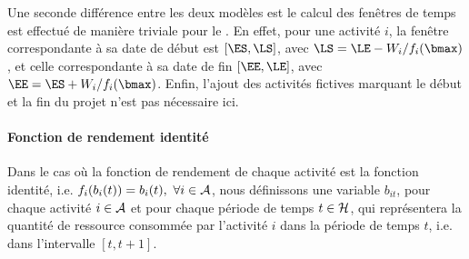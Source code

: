 Une seconde différence entre les deux modèles est le calcul des 
fenêtres de temps est effectué de manière triviale pour le \CECSP. 
En effet, pour une activité $i$,
la fenêtre correspondante à sa date de début est $[\ES,\LS]$, avec
$\LS=\LE-W_i/f_i(\bmax)$, et celle correspondante à sa date de fin
$[\EE,\LE]$, avec $\EE=\ES+W_i/f_i(\bmax)$. Enfin, l'ajout des
activités fictives marquant le début et la fin du projet n'est 
pas nécessaire ici.

\paragraph{Fonction de rendement identité}

Dans le cas où la fonction de rendement de chaque activité est la
fonction identité, i.e. $f_i(b_i(t))=b_i(t),\ \forall i \in \A$, nous
définissons une variable $b_{it}$, pour chaque activité $i \in {\cal A}$ et
pour chaque période de temps $t \in {\cal H}$, qui représentera la quantité
de ressource consommée par l'activité $i$ dans la période de temps
$t$, i.e. dans l'intervalle $[t,t+1]$.

